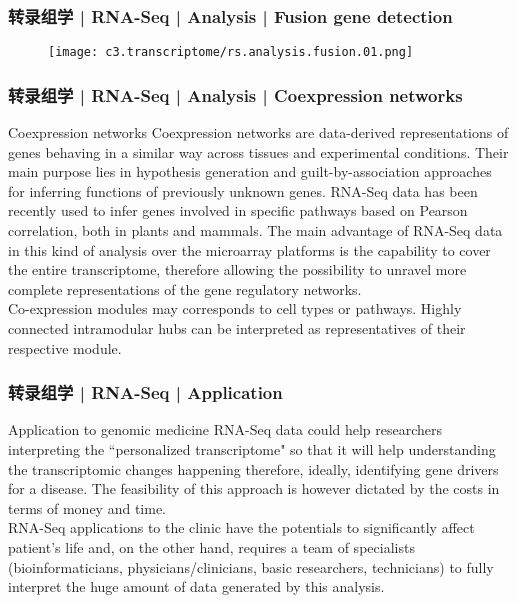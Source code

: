 \begin{frame}
  \frametitle{转录组学 | RNA-Seq | Analysis | Fusion gene detection}
  \begin{figure}
    \centering
    \texttt{[image: c3.transcriptome/rs.analysis.fusion.01.png]}
  \end{figure}
\end{frame}

\begin{frame}
  \frametitle{转录组学 | RNA-Seq | Analysis | Coexpression networks}
  \begin{block}{Coexpression networks}
    Coexpression networks are data-derived representations of genes behaving in a similar way across tissues and experimental conditions. Their main purpose lies in hypothesis generation and guilt-by-association approaches for inferring functions of previously unknown genes. RNA-Seq data has been recently used to infer genes involved in specific pathways based on Pearson correlation, both in plants and mammals. The main advantage of RNA-Seq data in this kind of analysis over the microarray platforms is the capability to cover the entire transcriptome, therefore allowing the possibility to unravel more complete representations of the gene regulatory networks.\\
 \vspace{0.5em}
 Co-expression modules may corresponds to cell types or pathways. Highly connected intramodular hubs can be interpreted as representatives of their respective module.
  \end{block}
\end{frame}

\begin{frame}
  \frametitle{转录组学 | RNA-Seq | Application}
  \begin{block}{Application to genomic medicine}
  RNA-Seq data could help researchers interpreting the ``personalized transcriptome" so that it will help understanding the transcriptomic changes happening therefore, ideally, identifying gene drivers for a disease. The feasibility of this approach is however dictated by the costs in terms of money and time.\\
  \vspace{1em}
  RNA-Seq applications to the clinic have the potentials to significantly affect patient's life and, on the other hand, requires a team of specialists (bioinformaticians, physicians/clinicians, basic researchers, technicians) to fully interpret the huge amount of data generated by this analysis.
  \end{block}
\end{frame}

